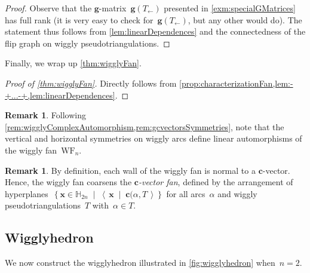 \documentclass{amsart}
\theoremstyle{definition}
\newtheorem{remark}[theorem]{Remark}
\newcommand{\HH}{\mathbb{H}} %
\renewcommand{\b}[1]{{\boldsymbol{#1}}} %
\newcommand{\set}[2]{\left\{ #1 \;\middle|\; #2 \right\}} %
\newcommand{\dotprod}[2]{\left\langle \, #1 \; \middle| \; #2 \, \right\rangle} %
\newcommand{\darkblue}{\color{darkblue}} %
\newcommand{\defn}[1]{\textsl{\darkblue #1}} %
\newcommand{\polytope}[1]{\mathds{#1}} %
\newcommand{\wigglyFan}{\mathrm{WF}} %
\newcommand{\wigglyhedron}{\polytope{W}} %
\begin{document}
\begin{proof}
Observe that the $\b{g}$-matrix~$\b{g}(T_\leftarrow)$ presented in \cref{exm:specialGMatrices} has full rank (it is very easy to check for~$\b{g}(T_\leftarrow)$, but any other would do).
The statement thus follows from \cref{lem:linearDependences} and the connectedness of the flip graph on wiggly pseudotriangulations.
\end{proof}

Finally, we wrap up \cref{thm:wigglyFan}.

\begin{proof}[Proof of \cref{thm:wigglyFan}]
Directly follows from \cref{prop:characterizationFan,lem:-+...-+,lem:linearDependences}.
\end{proof}

\begin{remark}
\label{rem:wigglyFanSymmetries}
Following \cref{rem:wigglyComplexAutomorphism,rem:gcvectorsSymmetries}, note that the vertical and horizontal symmetries on wiggly arcs define linear automorphisms of the wiggly fan~$\wigglyFan_n$.
\end{remark}

\begin{remark}
By definition, each wall of the wiggly fan is normal to a $\b{c}$-vector.
Hence, the wiggly fan coarsens the \defn{$\b{c}$-vector fan}, defined by the arrangement of hyperplanes~$\set{\b{x} \in \HH_{2n}}{\dotprod{\b{x}}{\b{c}(\alpha, T}}$ for all arcs~$\alpha$ and wiggly pseudotriangulations~$T$ with~$\alpha \in T$.
\end{remark}


\subsection{Wigglyhedron}
\label{subsec:wigglyhedron}

We now construct the wigglyhedron illustrated in \cref{fig:wigglyhedron} when~${n = 2}$.
%
\afterpage{
\begin{figure}
\centerline{}
\caption{The wigglyhedron~$\wigglyhedron_2$.}
\label{fig:wigglyhedron}
\end{figure}
}
\end{document}
